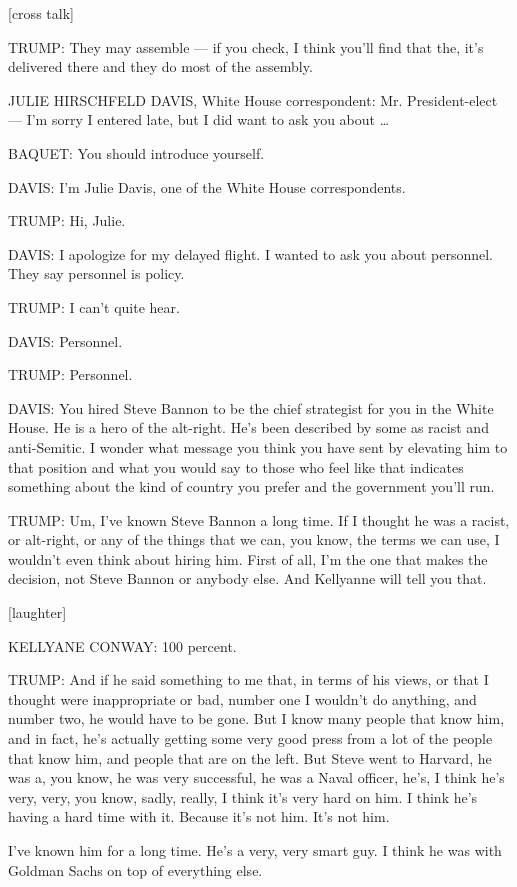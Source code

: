 {[}cross talk{]}

TRUMP: They may assemble --- if you check, I think you'll find that the,
it's delivered there and they do most of the assembly.

JULIE HIRSCHFELD DAVIS, White House correspondent: Mr. President-elect
--- I'm sorry I entered late, but I did want to ask you about \ldots{}

BAQUET: You should introduce yourself.

DAVIS: I'm Julie Davis, one of the White House correspondents.

TRUMP: Hi, Julie.

DAVIS: I apologize for my delayed flight. I wanted to ask you about
personnel. They say personnel is policy.

TRUMP: I can't quite hear.

DAVIS: Personnel.

TRUMP: Personnel.

DAVIS: You hired Steve Bannon to be the chief strategist for you in the
White House. He is a hero of the alt-right. He's been described by some
as racist and anti-Semitic. I wonder what message you think you have
sent by elevating him to that position and what you would say to those
who feel like that indicates something about the kind of country you
prefer and the government you'll run.

TRUMP: Um, I've known Steve Bannon a long time. If I thought he was a
racist, or alt-right, or any of the things that we can, you know, the
terms we can use, I wouldn't even think about hiring him. First of all,
I'm the one that makes the decision, not Steve Bannon or anybody else.
And Kellyanne will tell you that.

{[}laughter{]}

KELLYANE CONWAY: 100 percent.

TRUMP: And if he said something to me that, in terms of his views, or
that I thought were inappropriate or bad, number one I wouldn't do
anything, and number two, he would have to be gone. But I know many
people that know him, and in fact, he's actually getting some very good
press from a lot of the people that know him, and people that are on the
left. But Steve went to Harvard, he was a, you know, he was very
successful, he was a Naval officer, he's, I think he's very, very, you
know, sadly, really, I think it's very hard on him. I think he's having
a hard time with it. Because it's not him. It's not him.

I've known him for a long time. He's a very, very smart guy. I think he
was with Goldman Sachs on top of everything else.


